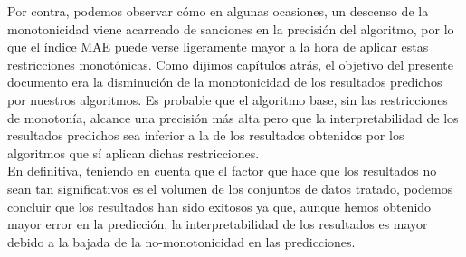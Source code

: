 Por contra, podemos observar cómo en algunas ocasiones, un descenso de la monotonicidad viene acarreado de sanciones en la precisión del algoritmo, por lo que el índice MAE puede verse ligeramente mayor a la hora de aplicar estas restricciones monotónicas. Como dijimos capítulos atrás, el objetivo del presente documento era la disminución de la monotonicidad de los resultados predichos por nuestros algoritmos. Es probable que el algoritmo base, sin las restricciones de monotonía, alcance una precisión más alta pero que la interpretabilidad de los resultados predichos sea inferior a la de los resultados obtenidos por los algoritmos que sí aplican dichas restricciones.\\

En definitiva, teniendo en cuenta que el factor que hace que los resultados no sean tan significativos es el volumen de los conjuntos de datos tratado, podemos concluir que los resultados han sido exitosos ya que, aunque hemos obtenido mayor error en la predicción, la interpretabilidad de los resultados es mayor debido a la bajada de la no-monotonicidad en las predicciones.

\newpage











